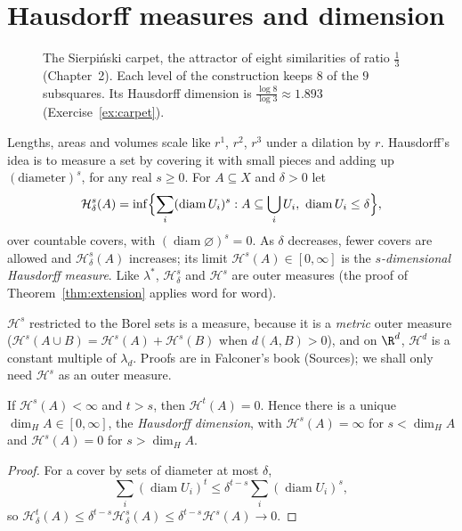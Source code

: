 \section{Hausdorff measures and dimension}

\begin{figure}[ht]
\centering
{}
\caption{The Sierpi\'nski carpet, the attractor of eight similarities of ratio $\frac13$ (Chapter~2). Each level of the construction keeps $8$ of the $9$ subsquares. Its Hausdorff dimension is $\frac{\log8}{\log3}\approx1.893$
(Exercise~\ref{ex:carpet}).}
\label{fig:carpet}
\end{figure}

Lengths, areas and volumes scale like $r^1$, $r^2$, $r^3$ under a dilation by $r$. Hausdorff's idea is to measure a set by covering it with small pieces and adding up $(\text{diameter})^s$, for any real $s\ge0$. For $A\subseteq X$
and $\delta>0$ let
\[\mathcal H^s_\delta(A)=\inf\Bigl\{\sum_i(\operatorname{diam}U_i)^s:A\subseteq\bigcup_iU_i,\ \operatorname{diam}U_i\le\delta\Bigr\},\]
over countable covers, with $(\operatorname{diam}\varnothing)^s=0$. As $\delta$ decreases, fewer covers are allowed and $\mathcal H^s_\delta(A)$ increases; its limit $\mathcal H^s(A)\in[0,\infty]$ is the \emph{$s$-dimensional Hausdorff measure}. Like
$\lambda^*$, $\mathcal H^s_\delta$ and $\mathcal H^s$ are outer measures (the proof of Theorem~\ref{thm:extension} applies word for word).

\begin{remark}
$\mathcal H^s$ restricted to the Borel sets is a measure, because it is a \emph{metric} outer measure ($\mathcal H^s(A\cup B)=\mathcal H^s(A)+\mathcal H^s(B)$ when $d(A,B)>0$), and on $\R^d$, $\mathcal H^d$ is a constant multiple of $\lambda_d$.
Proofs are in Falconer's book (Sources); we shall only need $\mathcal H^s$ as an outer measure.
\end{remark}

\begin{proposition}\label{prop:jump}
If $\mathcal H^s(A)<\infty$ and $t>s$, then $\mathcal H^t(A)=0$. Hence there is a unique $\dim_HA\in[0,\infty]$, the \emph{Hausdorff dimension}, with $\mathcal H^s(A)=\infty$ for $s<\dim_HA$ and $\mathcal H^s(A)=0$ for $s>\dim_HA$.
\end{proposition}
\begin{proof}
For a cover by sets of diameter at most $\delta$, \[\sum_i(\operatorname{diam}U_i)^t\le\delta^{t-s}\sum_i(\operatorname{diam}U_i)^s,\] so $\mathcal H^t_\delta(A)\le\delta^{t-s}\mathcal H^s_\delta(A)\le\delta^{t-s}\mathcal H^s(A)\to0$.
\end{proof}

